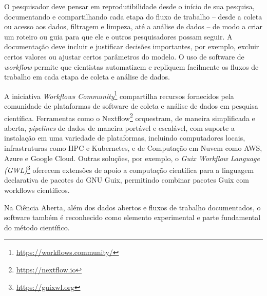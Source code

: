 O pesquisador deve pensar em reprodutibilidade desde o início de sua pesquisa, documentando e compartilhando cada etapa do fluxo de trabalho -- desde a coleta ou acesso aos dados, filtragem  e limpeza, até a análise de dados -- de modo a criar um roteiro ou guia para que ele e outros pesquisadores possam seguir.  A documentação deve incluir e justificar decisões importantes, por exemplo, excluir certos valores ou ajustar certos parâmetros do modelo.
O uso de software de {\em workflow} permite que cientistas automatizem e repliquem facilmente os fluxos de trabalho
em cada etapa de coleta e análise de dados.

A iniciativa {\em Workflows Community}\footnote{\url{https://workflows.community/}} compartilha recursos fornecidos pela comunidade de plataformas de software de coleta e análise de dados em pesquisa científica. 
%
Ferramentas como o Nextflow\footnote{\url{https://nextflow.io}} orquestram, de maneira simplificada e aberta, {\em pipelines} de dados de maneira portável e escalável, com suporte a instalação em uma variedade de plataformas, incluindo computadores locais,  infrastruturas como HPC e Kubernetes, e de Computação em Nuvem como AWS, Azure e Google Cloud. 
%
Outras soluções, por exemplo, o {\em Guix Workflow Language (GWL)}\footnote{\url{https://guixwl.org}} 
oferecem extensões de apoio a computação científica para a linguagem declarativa de pacotes do GNU Guix, permitindo combinar pacotes Guix com workflows científicos.

Na Ciência Aberta, além dos dados abertos e fluxos de trabalho documentados, o software também é reconhecido como elemento experimental e parte fundamental do método científico.


